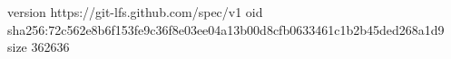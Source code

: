 version https://git-lfs.github.com/spec/v1
oid sha256:72c562e8b6f153fe9c36f8e03ee04a13b00d8cfb0633461c1b2b45ded268a1d9
size 362636
